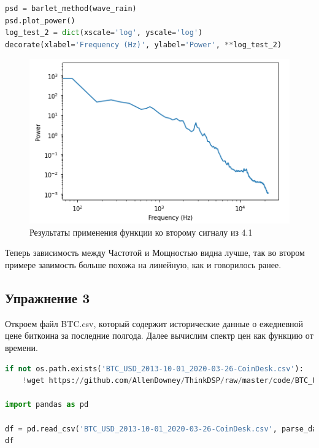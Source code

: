 \begin{lstlisting}[language=Python]
psd = barlet_method(wave_rain)
psd.plot_power()
log_test_2 = dict(xscale='log', yscale='log')
decorate(xlabel='Frequency (Hz)', ylabel='Power', **log_test_2)
\end{lstlisting}

\begin{figure}[H]
	\begin{center}
		\includegraphics[scale=1]{fig/lab04/lab04_06.png}
		\caption{Результаты применения функции ко второму сигналу из 4.1}
	\end{center}
\end{figure}

Теперь зависимость между Частотой и Мощностью видна лучше, так во втором примере завимость больше похожа на линейную, как и говорилось ранее.


\subsection{Упражнение 3}

Откроем файл BTC.csv, который содержит исторические данные о ежедневной цене биткоина за последние полгода. Далее вычислим спектр цен как функцию от времени.

\begin{lstlisting}[language=Python]
if not os.path.exists('BTC_USD_2013-10-01_2020-03-26-CoinDesk.csv'):
    !wget https://github.com/AllenDowney/ThinkDSP/raw/master/code/BTC_USD_2013-10-01_2020-03-26-CoinDesk.csv
    
import pandas as pd

df = pd.read_csv('BTC_USD_2013-10-01_2020-03-26-CoinDesk.csv', parse_dates=[0])
df
\end{lstlisting}

